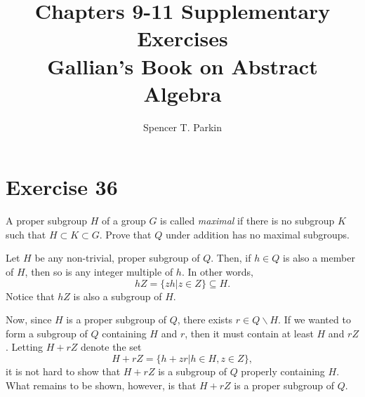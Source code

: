\documentclass[12pt]{article}
\title{Chapters 9-11 Supplementary Exercises\\Gallian's Book on Abstract Algebra}
\author{Spencer T. Parkin}
\begin{document}
\maketitle

%
%
%
%
%
%

\section*{Exercise 36}

A proper subgroup $H$ of a group $G$ is called {\it maximal} if there is no
subgroup $K$ such that $H\subset K\subset G$.  Prove that $Q$ under
addition has no maximal subgroups.

Let $H$ be any non-trivial, proper subgroup of $Q$.  Then, if $h\in Q$ is also a
member of $H$, then so is any integer multiple of $h$.  In other words,
\begin{equation*}
hZ=\{zh|z\in Z\}\subseteq H.
\end{equation*}
Notice that $hZ$ is also a subgroup of $H$.

Now, since $H$ is a proper subgroup of $Q$, there exists $r\in Q\backslash H$.
If we wanted to form a subgroup of $Q$ containing $H$ and $r$, then it must
contain at least $H$ and $rZ$.  Letting $H+rZ$ denote the set
\begin{equation*}
H+rZ=\{h+zr|h\in H,z\in Z\},
\end{equation*}
it is not hard to show that $H+rZ$ is a subgroup of $Q$ properly containing $H$.
What remains to be shown, however, is that $H+rZ$ is a proper subgroup of $Q$.
\end{document}
